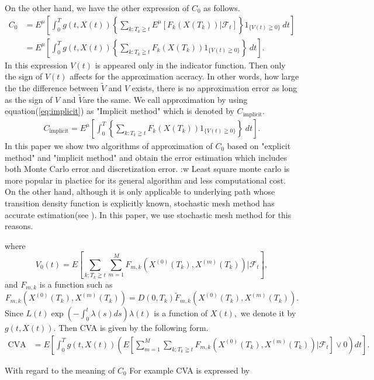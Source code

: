 \documentclass[12pt]{article}
\begin{document}
On the other hand, we have the other expression of $C_0$ as follows.
\begin{align}\label{eq:implicit}
  C_0 &= E^{\mu}\left[\int_{0}^T g(t, X(t)) \left\{ \sum_{k:T_k\geqq t} E^{\mu} \left[ F_k({X}(T_k)) |\mathcal{F}_t \right]\right \} 1_{\{V(t) \geqq 0\}}\ dt \right]\nonumber \\
      &=E^{\mu}\left[\int_{0}^T  g(t, X(t)) \left\{ \sum_{k:T_k\geqq t} F_k({X}(T_k)) 1_{\{V(t) \geqq 0\}}\right \} \ dt \right].
\end{align}
In this expression $V(t)$ is appeared only in the indicator function. Then only the sign of
$V(t)$ affects for the approximation accracy. In other words, how large the the difference between
$\tilde{V}$ and $V$ exists, there is no approximation error as long as the sign of $V$ and $\tilde{V}$are the same.
We call approximation by using equation(\ref{eq:implicit}) as "Implicit method" which is denoted by $C_{\text{implicit}}$.
\begin{align}
   C_{\text{implicit}}=E^{\mu}\left[\int_{0}^T \left\{ \sum_{k:T_k\geqq t} F_k({X}(T_k)) 1_{\{V(t) \geqq 0\}}\right \} \ dt \right].
\end{align}
In this paper we show two algorithms of approximation of $C_0$ based on "explicit method" and 
"implicit method" and obtain the error estimation which includes both Monte Carlo error and
discretization error.
:w
Least square monte carlo is more popular in plactice for its general algorithm and
less computational cost.
On the other hand, although it is only applicable to underlying path whose transition density function is  explicitly known, stochastic mesh method has accurate estimation(see \cite{KM}).
In this paper, we use stochastic mesh method for this reasons.

where
$$V_0(t) =E[ \sum_{k; T_k \geqq t}\sum_{m=1}^M F_{m,k}(X^{(0)}(T_k), X^{(m)}(T_k)) | \mathcal{F}_t],$$
and $F_{m,k}$ is a function such as 
$$F_{m,k}(X^{(0)}(T_k), X^{(m)}(T_k))=D(0,T_k)\tilde{F}_{m,k}(X^{(0)}(T_k), X^{(m)}(T_k)).$$
Since $L(t)\exp(-\int_0^t \lambda(s)ds ) \lambda(t)$ is a function of $X(t),$ we denote it by $g(t,X(t)).$ Then CVA is given by the following form. 
\begin{align}
\text{CVA}&=E[\int_0^T g(t,X(t))  (E[\sum_{m=1}^M \sum_{k; T_k \geqq t}F_{m,k}(X^{(0)}(T_k), X^{(m)}(T_k)) | \mathcal{F}_t] \vee 0)  dt ] \label{defCVA2}.
\end{align}




With regard to the meaning of $C_0$
For example CVA is expressed by 
\end{document}

